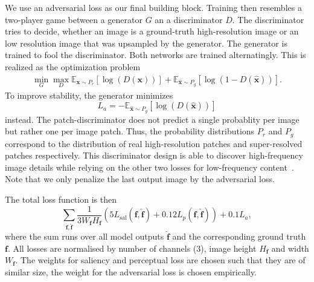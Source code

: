 \documentclass{scrartcl}
\newcommand{\img}{\bm{f}} %
\begin{document}
We use an adversarial loss as our final building block.
Training then resembles a two-player game between a generator \(G\) an a discriminator \(D\).
The discriminator tries to decide, whether an image is a ground-truth high-resolution image or an low resolution image that was upsampled by the generator.
The generator is trained to fool the discriminator.
Both networks are trained alternatingly.
This is realized as the optimization problem~\cite{GAN}
\begin{align}
 \min_G \max_D \mathbb{E}_{\bm{x} \sim P_r} \left[ \log (D({\bm{x}})) \right] +
  \mathbb{E}_{\hat{\bm{x}} \sim P_g} \left[  \log (1 - D(\hat{\bm{x}})) \right].
\end{align}
To improve stability, the generator minimizes
\begin{equation}
  L_a = - \mathbb{E}_{\hat{\bm{x}} \sim P_g} \left[ \log (D(\hat{\bm{x}})) \right]
\end{equation}
instead.
The patch-discriminator does not predict a single probablity per image but rather one per image patch.
Thus, the probability distributions $P_r$ and $P_g$ correspond to the distribution of real high-resolution patches and super-resolved patches respectively.
This discriminator design is able to discover high-frequency image details while relying on the other two losses for low-frequency content~\cite{PatchGAN}.
Note that we only penalize the last output image by the adversarial loss.

The total loss function is then
\begin{equation}
  \label{eq:total-loss}
\sum_{\img, \hat{\img}}
\frac{1}{3 W_{\img} H_{\img}}
  \left( 5 L_{\text{sal}} (\img, \hat{\img}) + 0.12  L_p(\img, \hat{\img}) \right) + 0.1 L_a,
\end{equation}
where the sum runs over all model outputs \(\hat{\img}\) and the corresponding ground truth \(\img\).
All losses are normalised by number of channels (3), image height \(H_{\img}\) and width \(W_{\img}\).
The weights for saliency and perceptual loss are chosen such that they are of similar size, the weight for the adversarial loss is chosen empirically.
\end{document}
